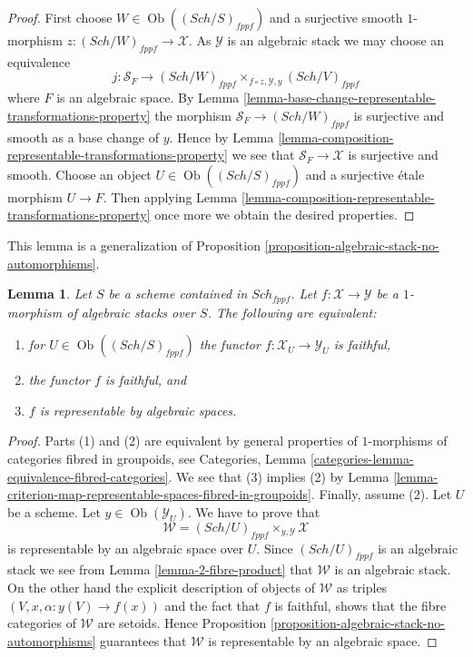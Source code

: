 \documentclass{stacks-project}
\theoremstyle{plain}
\newtheorem{lemma}[subsection]{Lemma}
\theoremstyle{definition}
\theoremstyle{remark}
\numberwithin{equation}{subsection}
\def\Sch{\mathit{Sch}}
\def\Ob{\mathop{\mathrm{Ob}}\nolimits}
\begin{document}
\begin{proof}
First choose $W \in \Ob((\Sch/S)_{fppf})$ and a surjective
smooth $1$-morphism $z : (\Sch/W)_{fppf} \to \mathcal{X}$.
As $\mathcal{Y}$ is an algebraic stack we may choose an equivalence
$$
j :
\mathcal{S}_F
\longrightarrow
(\Sch/W)_{fppf}
\times_{f \circ z, \mathcal{Y}, y}
(\Sch/V)_{fppf}
$$
where $F$ is an algebraic space. By
Lemma \ref{lemma-base-change-representable-transformations-property}
the morphism
$\mathcal{S}_F \to (\Sch/W)_{fppf}$ is surjective and smooth
as a base change of $y$. Hence by
Lemma \ref{lemma-composition-representable-transformations-property}
we see that $\mathcal{S}_F \to \mathcal{X}$ is surjective and smooth.
Choose an object $U \in \Ob((\Sch/S)_{fppf})$
and a surjective \'etale morphism $U \to F$. Then applying
Lemma \ref{lemma-composition-representable-transformations-property}
once more we obtain the desired properties.
\end{proof}

\noindent
This lemma is a generalization of
Proposition \ref{proposition-algebraic-stack-no-automorphisms}.

\begin{lemma}
\label{lemma-characterize-representable-by-algebraic-spaces}
Let $S$ be a scheme contained in $\Sch_{fppf}$.
Let $f : \mathcal{X} \to \mathcal{Y}$ be a $1$-morphism of algebraic
stacks over $S$. The following are equivalent:
\begin{enumerate}
\item for $U \in \Ob((\Sch/S)_{fppf})$
the functor $f : \mathcal{X}_U \to \mathcal{Y}_U$ is faithful,
\item the functor $f$ is faithful, and
\item $f$ is representable by algebraic spaces.
\end{enumerate}
\end{lemma}

\begin{proof}
Parts (1) and (2) are equivalent by general properties of $1$-morphisms
of categories fibred in groupoids, see
Categories, Lemma \ref{categories-lemma-equivalence-fibred-categories}.
We see that (3) implies (2) by
Lemma \ref{lemma-criterion-map-representable-spaces-fibred-in-groupoids}.
Finally, assume (2).
Let $U$ be a scheme. Let $y \in \Ob(\mathcal{Y}_U)$.
We have to prove that
$$
\mathcal{W} = (\Sch/U)_{fppf} \times_{y, \mathcal{Y}} \mathcal{X}
$$
is representable by an algebraic space over $U$. Since
$(\Sch/U)_{fppf}$ is an algebraic stack we see from
Lemma \ref{lemma-2-fibre-product}
that $\mathcal{W}$ is an algebraic stack.
On the other hand the explicit description of objects of $\mathcal{W}$
as triples $(V, x, \alpha : y(V) \to f(x))$ and the fact that $f$ is
faithful, shows that the fibre categories of $\mathcal{W}$ are setoids. Hence
Proposition \ref{proposition-algebraic-stack-no-automorphisms}
guarantees that $\mathcal{W}$ is representable by an algebraic space.
\end{proof}
\end{document}
